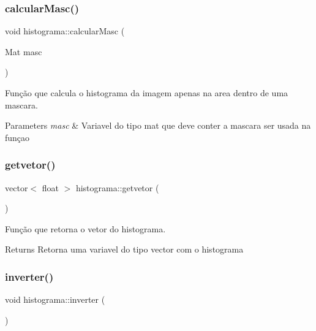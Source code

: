 \mbox{\label{classhistograma_a8648881cbd8dd1fc701c8acd0022be0a}} 
\subsubsection{\texorpdfstring{calcular\+Masc()}{calcularMasc()}}
{\footnotesize\ttfamily void histograma\+::calcular\+Masc (\begin{DoxyParamCaption}\item[{Mat}]{masc }\end{DoxyParamCaption})}



Função que calcula o histograma da imagem apenas na area dentro de uma mascara. 


\begin{DoxyParams}{Parameters}
{\em masc} & Variavel do tipo mat que deve conter a mascara ser usada na funçao \\
\hline
\end{DoxyParams}
\mbox{\label{classhistograma_a79bb95f6bc4ce9f3e12a94419a8ffaab}} 
\subsubsection{\texorpdfstring{getvetor()}{getvetor()}}
{\footnotesize\ttfamily vector$<$ float $>$ histograma\+::getvetor (\begin{DoxyParamCaption}{ }\end{DoxyParamCaption})}



Função que retorna o vetor do histograma. 

\begin{DoxyReturn}{Returns}
Retorna uma variavel do tipo vector com o histograma 
\end{DoxyReturn}
\mbox{\label{classhistograma_a46f65a2b34dc9f966974127cf338dfda}} 
\subsubsection{\texorpdfstring{inverter()}{inverter()}}
{\footnotesize\ttfamily void histograma\+::inverter (\begin{DoxyParamCaption}{ }\end{DoxyParamCaption})}



